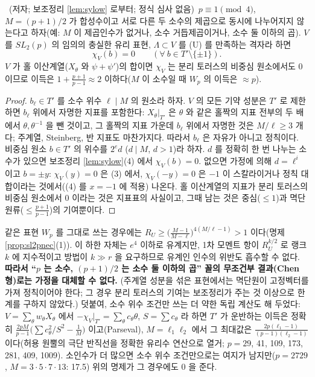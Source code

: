 \begin{proposition}\label{prop:composite}\tagP\ (저자; 보조정리 \ref{lem:sylow} 로부터; 정식 심사 없음)\
$p\equiv1\pmod4$, $M=(p+1)/2$ 가 합성수이고 서로 다른 두 소수의 제곱으로 동시에 나누어지지 않는다고 하자(예: $M$ 이 제곱인수가 없거나, 소수 거듭제곱이거나, 소수 둘 이하의 곱). $V$ 를 $SL_2(p)$ 의 임의의 충실한 유리 표현, $\Lambda\subset V$ 를 (U) 를 만족하는 격자라 하면
\[
\chi_V(b)=0\qquad(\forall\ b\in T'\setminus\{\pm1\}).
\]
$V$ 가 홀 이산계열($X_\theta$ 와 $\psi+\psi'$)의 합이면 $\chi_V$ 는 분리 토러스의 비중심 원소에서도 0 이므로 이득은 $1+\tfrac{p+1}{p-1}\approx2$ 이하다($M$ 이 소수일 때 $W_p$ 의 이득은 $\approx p$).
\end{proposition}
\begin{proof}
$b_\ell\in T'$ 를 소수 위수 $\ell\mid M$ 의 원소라 하자. $V$ 의 모든 기약 성분은 $T'$ 로 제한하면 $b_\ell$ 위에서 자명한 지표를 포함한다: $X_\theta|_{T'}$ 은 $\theta$ 와 같은 홀짝의 지표 전부의 두 배에서 $\theta,\theta^{-1}$ 을 뺀 것이고, 그 홀짝의 지표 가운데 $b_\ell$ 위에서 자명한 것은 $M/\ell\ge3$ 개다; 주계열, Steinberg, 반 지표도 마찬가지다. 따라서 $b_\ell$ 은 자유가 아니고 정칙이다. 비중심 원소 $b\in T'$ 의 위수를 $2^ed$ ($d\mid M$, $d>1$)라 하자. $d$ 를 정확히 한 번 나누는 소수가 있으면 보조정리 \ref{lem:sylow}(4) 에서 $\chi_V(b)=0$. 없으면 가정에 의해 $d=\ell^i$ 이고 $b=\pm y$: $\chi_V(y)=0$ 은 (3) 에서, $\chi_V(-y)=0$ 은 $-1$ 이 스칼라이거나 정칙 대합이라는 것에서((4) 를 $x=-1$ 에 적용) 나온다. 홀 이산계열의 지표가 분리 토러스의 비중심 원소에서 0 이라는 것은 지표표의 사실이고, 그때 남는 것은 중심($\le1$)과 멱단원류($\le\tfrac{p+1}{p-1}$)의 기여뿐이다.
\end{proof}
\noindent 같은 표현 $W_p$ 를 그대로 쓰는 경우에는 $R_U\ge\big(\tfrac{M-1}{M-\ell}\big)^{4(M/\ell-1)}>1$ 이다(명제 \ref{prop:sl2pnec}(1)). 이 하한 자체는 $e^4$ 이하로 유계지만, 1차 모멘트 항이 $R_U^{k/2}$ 로 랭크 $k$ 에 지수적이고 방법이 $k\gg r$ 을 요구하므로 유계인 인수의 위반도 흡수할 수 없다. \textbf{따라서 ``$p$ 는 소수, $(p+1)/2$ 는 소수 둘 이하의 곱'' 꼴의 무조건부 결과(Chen 형)로는 가정을 대체할 수 없다.} (주계열 성분을 섞은 표현에서는 멱단원이 고정벡터를 가져 정칙이어야 한다; 그 경우 분리 토러스의 기여는 보조정리가 주는 것 이상으로 한계를 구하지 않았다.) 덧붙여, 소수 위수 조건만 쓰는 더 약한 독립 계산도 해 두었다: $V=\sum_\theta w_\theta X_\theta$ 에서 $-\chi_V|_{T'}=\sum_\theta c_\theta\theta$, $S=\sum c_\theta$ 라 하면 $T'$ 가 운반하는 이득은 정확히 $\tfrac{2pM}{p-1}\big(\sum c_\theta^2/S^2-\tfrac1M\big)$ 이고(Parseval), $M=\ell_1\ell_2$ 에서 그 최대값은 $\tfrac{2p(\ell_1-1)}{(p-1)(\ell_2-1)}$ 이다(허용 원뿔의 극단 반직선을 정확한 유리수 연산으로 열거; $p=29$, 41, 109, 173, 281, 409, 1009). 소인수가 더 많으면 소수 위수 조건만으로는 여지가 남지만($p=2729$, $M=3\cdot5\cdot7\cdot13$: 17.5) 위의 명제가 그 경우에도 0 을 준다.

